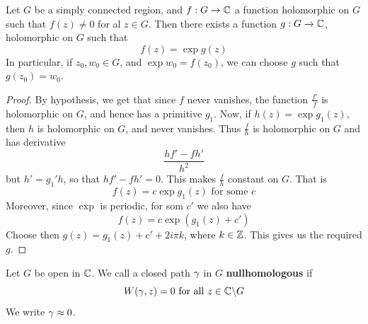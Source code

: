 \begin{corollary}
    Let $G$ be a simply connected region, and  $f:G \xrightarrow{} \mathbb{C}$ a
    function holomorphic on $G$ such that  $f(z) \neq 0$ for al $z \in G$. Then
    there exists a function  $g:G \xrightarrow{} \mathbb{C}$, holomorphic on $G$ such that
    \begin{equation*}
        f(z)=\exp{g(z)}
    \end{equation*}
    In particular, if $z_0,w_0 \in G$, and $\exp{w_0}=f(z_0)$, we can choose $g$
    such that $g(z_0)=w_0$.
\end{corollary}
\begin{proof}
    By hypothesis, we get that since $f$ never vanishes, the function
    $\frac{f'}{f}$ is holomorphic on $G$, and hence has a primitive $g_1$. Now, if
    $h(z)=\exp{g_1(z)}$, then $h$ is holomorphic on  $G$, and never vanishes. Thus
     $\frac{f}{h}$ is holomorphic on $G$ and has derivative
     \begin{equation*}
         \frac{hf'-fh'}{h^2}
     \end{equation*}
     but $h'=g_1'h$, so that $hf'-fh'=0$. This makes  $\frac{f}{h}$ constant on
     $G$. That is
     \begin{equation*}
         f(z)=c\exp{g_1(z)} \text{ for some } c
     \end{equation*}
     Moreover, since $\exp$ is periodic, for som  $c'$ we also have
     \begin{equation*}
         f(z)=c\exp{(g_1(z)+c')}
     \end{equation*}
     Choose then $g(z)=g_1(z)+c'+2i\pi{k}$, where $k \in \mathbb{Z}$. This gives us the
     required $g$.
\end{proof}

\begin{definition}
    Let $G$ be open in $\mathbb{C}$. We call a closed path $\gamma$ in $G$
    \textbf{nullhomologous} if
    \begin{equation*}
        W(\gamma,z)=0 \text{ for all } z \in \mathbb{C} \backslash G
    \end{equation*}
    We write
    $\gamma \approx 0$.
\end{definition}

